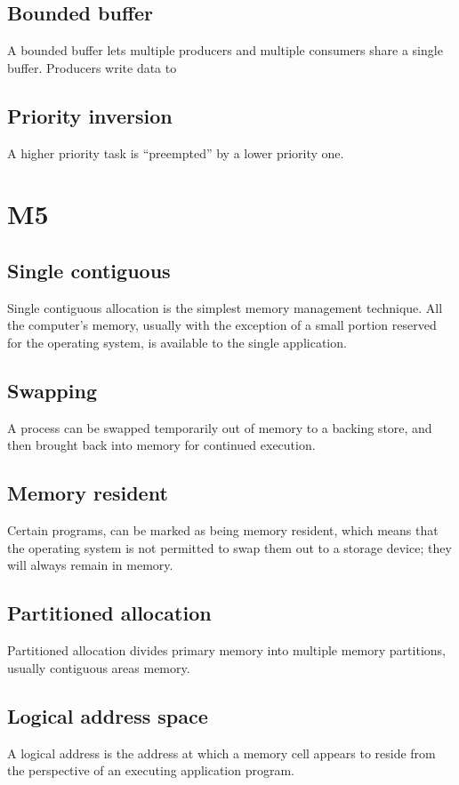 \begin{multicols}{2}
\subsection{Bounded buffer}
A bounded buffer lets multiple producers and multiple
consumers share a single buffer. Producers write data to

\subsection{Priority inversion}
A higher priority task is “preempted” by a lower priority one.

\section{M5}
\subsection{Single contiguous}
Single contiguous allocation is the simplest
memory management technique. All the
computer's memory, usually with the
exception of a small portion reserved for
the operating system, is available to the
single application.

\subsection{Swapping}
A process can be swapped temporarily
out of memory to a backing store, and
then brought back into memory for continued execution.

\subsection{Memory resident}
Certain programs, can be marked as being
memory resident, which means that the operating
system is not permitted to swap them out to a
storage device; they will always remain in
memory.

\subsection{Partitioned allocation}
Partitioned allocation divides primary memory into multiple memory
partitions, usually contiguous areas memory.

\subsection{Logical address space}
A logical address is the address at which
a memory cell appears to reside from the perspective of an
executing application program.


\end{multicols}

